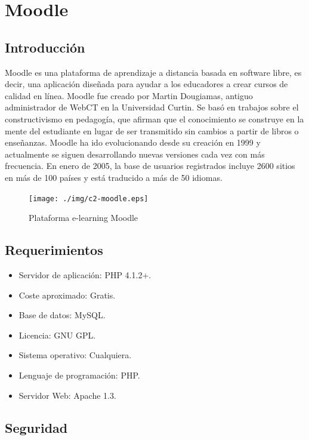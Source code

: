 \section{Moodle}

\subsection{Introducción}

Moodle\cite{moodle} es una plataforma de aprendizaje a distancia basada en software libre, es decir, una aplicación diseñada para ayudar a los educadores a crear cursos de calidad en línea. Moodle fue creado por Martin Dougiamas, antiguo administrador de WebCT en la Universidad Curtin. Se basó en trabajos sobre el constructivismo en pedagogía, que afirman que el conocimiento se construye en la mente del estudiante en lugar de ser transmitido sin cambios a partir de libros o enseñanzas. Moodle ha ido evolucionando desde su creación en 1999 y actualmente se siguen desarrollando nuevas versiones cada vez con más frecuencia. En enero de 2005, la base de usuarios registrados incluye 2600 sitios en más de 100 países y está traducido a más de 50 idiomas.

\begin{figure}[h]
	\texttt{[image: ./img/c2-moodle.eps]}
	\caption{Plataforma e-learning Moodle}
\end{figure}

\subsection{Requerimientos}

\begin{itemize}
	\item Servidor de aplicación: PHP 4.1.2+. 
	\item Coste aproximado: Gratis.
	\item Base de datos: MySQL.
	\item Licencia: GNU GPL.
	\item Sistema operativo: Cualquiera. 
	\item Lenguaje de programación: PHP. 
	\item Servidor Web: Apache 1.3.
\end{itemize}

\subsection{Seguridad}

